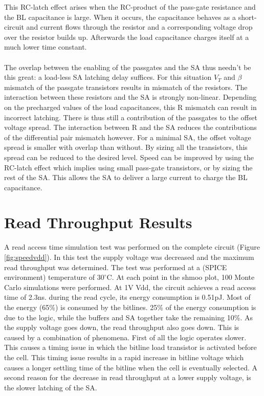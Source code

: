 \documentclass[journal]{IEEEtran}
\begin{document}
This RC-latch effect arises when the RC-product of the pass-gate resistance and the BL capacitance is large. When it occurs, the capacitance behaves as a short-circuit and current flows through the resistor and a corresponding voltage drop over the resistor builds up. Afterwards the load capacitance charges itself at a much lower time constant.\\\\
The overlap between the enabling of the passgates and the SA thus needn't be this great: a load-less SA latching delay suffices. For this situation $V_{T}$ and $\beta$ mismatch of the passgate transistors results in mismatch of the resistors. The interaction between these resistors and the SA is strongly non-linear. Depending on the precharged values of the load capacitances, this R mismatch can result in incorrect latching. There is thus still a contribution of the passgates to the offset voltage spread. The interaction between R and the SA reduces the contributions of the differential pair mismatch however. For a minimal SA, the offset voltage spread is smaller with overlap than without. By sizing all the transistors, this spread can be reduced to the desired level. Speed can be improved by using the RC-latch effect which implies using small pass-gate transistors, or by sizing the rest of the SA. This allows the SA to deliver a large current to charge the BL capacitance.

\section{Read Throughput Results}\label{final}
A read access time simulation test was performed on the complete circuit (Figure \ref{fig:speedvdd}). In this test the supply voltage was decreased and the maximum read throughput was determined. The test was performed at a (SPICE environment) temperature of $30^{\circ}\mathrm{C}$. At each point in the shmoo plot, 100 Monte Carlo simulations were performed. At 1V Vdd, the circuit achieves a read access time of 2.3ns. during the read cycle, its energy consumption is 0.51pJ. Most of the energy (65\%) is consumed by the bitlines. 25\% of the energy consumption is due to the logic, while the buffers and SA together take the remaining 10\%. As the supply voltage goes down, the read throughput also goes down. This is caused by a combination of phenomena. First of all the logic operates slower. This causes a timing issue in which the bitline load transistor is activated before the cell. This timing issue results in a rapid increase in bitline voltage which causes a longer settling time of the bitline when the cell is eventually selected. A second reason for the decrease in read throughput at a lower supply voltage, is the slower latching of the SA.
\end{document}
